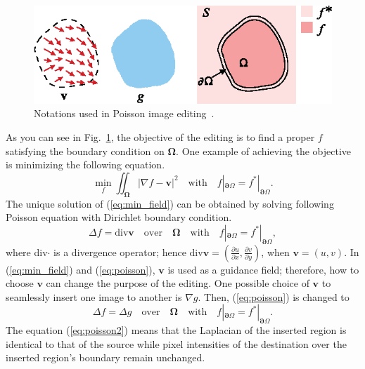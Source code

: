 \documentclass[11pt]{hyu_thesis}
\begin{document}
\begin{figure}
	\centering
	\includegraphics[width=0.9\linewidth]{poisson_image_editing_notation.eps}
	\caption{Notations used in Poisson image editing~\cite{Perez2003}.}
	\label{fig:poisson_notation}
\end{figure}
As you can see in Fig.~\ref{fig:poisson_notation}, the objective of the editing is to find a proper $f$ satisfying the boundary condition on $\boldsymbol\Omega$. One example of achieving the objective is minimizing the following equation.
\begin{equation}
\label{eq:min_field}
\min_f \iint_{\boldsymbol\Omega} |\nabla f - \textbf{v}|^2 \quad \textrm{with} \quad f|_{\boldsymbol\partial\Omega}=f^{*}|_{\boldsymbol\partial\Omega}.
\end{equation}
The unique solution of (\ref{eq:min_field}) can be obtained by solving following Poisson equation with Dirichlet boundary condition.
\begin{equation}
\label{eq:poisson}
\Delta f = \textrm{div}\textbf{v} \quad \textrm{over} \quad \boldsymbol\Omega \quad \textrm{with} \quad f|_{\boldsymbol\partial\Omega}=f^{*}|_{\boldsymbol\partial\Omega},
\end{equation}
where div$\cdot$ is a divergence operator; hence $\textrm{div}\textbf{v}= \left( \frac{\partial u}{\partial x},\frac{\partial v}{\partial y} \right)$, when $\textbf{v}=(u, v)$. In (\ref{eq:min_field}) and (\ref{eq:poisson}), $\textbf{v}$ is used as a guidance field; therefore, how to choose $\textbf{v}$ can change the purpose of the editing. One possible choice of $\textbf{v}$ to seamlessly insert one image to another is $\nabla g$. Then, (\ref{eq:poisson}) is changed to
\begin{equation}
\label{eq:poisson2}
\Delta f = \Delta g \quad \textrm{over} \quad \boldsymbol\Omega \quad \textrm{with} \quad f|_{\boldsymbol\partial\Omega}=f^{*}|_{\boldsymbol\partial\Omega}.
\end{equation}
The equation (\ref{eq:poisson2}) means that the Laplacian of the inserted region is identical to that of the source while pixel intensities of the destination over the inserted region's boundary remain unchanged.
\end{document}
